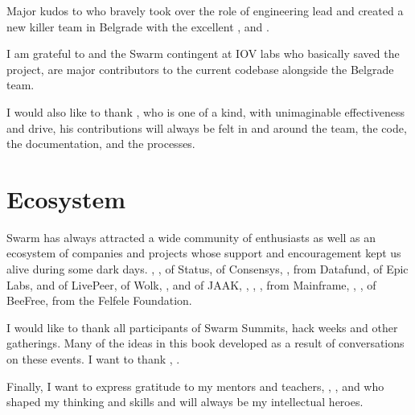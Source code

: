 Major kudos to  who bravely took over the role of engineering lead and created a new killer team in Belgrade with the excellent ,  and . 

I am grateful to  and the Swarm contingent at IOV labs who basically saved the project,  are major contributors to the current codebase alongside the  Belgrade team. 

I would also like to thank , who is one of a kind, with unimaginable effectiveness and drive, his contributions will always be felt in and around the team, the code, the documentation, and the processes.

\section*{Ecosystem}

Swarm has always attracted a wide community of enthusiasts as well as an ecosystem of companies and projects whose support and encouragement kept us alive during some dark days. 
, ,  of Status,  of Consensys, ,  from Datafund,  of Epic Labs,  and  of LivePeer,  of Wolk, ,  and  of JAAK, , , ,  from Mainframe, , ,  of BeeFree,  from the  Felfele Foundation. 

I would like to thank all participants of Swarm Summits, hack weeks and other gatherings. Many of the ideas in this book developed as a result of conversations on these events. I want to thank , .

Finally, I want to express gratitude to my mentors and teachers, , ,  and  who shaped my thinking and skills and will always be my intellectual heroes.

